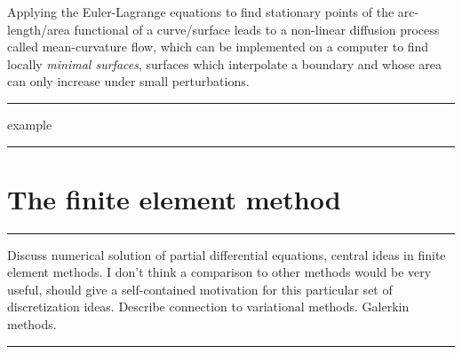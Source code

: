 \documentclass{article}
\newcommand{\todo}[1]{\vskip 0.1in \hrule \vskip 0.03in {#1} \vskip 0.03in \hrule \vskip 0.1in}
\begin{document}
Applying the Euler-Lagrange equations to find stationary points of the arc-length/area functional of a curve/surface
leads to a non-linear diffusion process called mean-curvature flow, which can be implemented on a computer to find
locally \textit{minimal surfaces}, surfaces which interpolate a boundary and whose area can only increase under small perturbations.
\todo{example}

\section{The finite element method}
\todo{
Discuss numerical solution of partial differential equations, central ideas in finite element methods.
I don't think a comparison to other methods would be very useful, should give a self-contained motivation for this particular
set of discretization ideas.
Describe connection to variational methods.
Galerkin methods.
}
\end{document}
